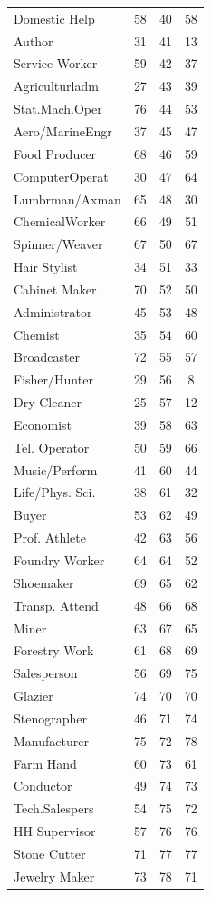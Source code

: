 \begin{tabular}{lccc}
Domestic Help&58&40&58\\
Author&31&41&13\\
Service Worker&59&42&37\\
Agriculturladm&27&43&39\\
Stat.Mach.Oper&76&44&53\\
Aero/MarineEngr&37&45&47\\
Food Producer&68&46&59\\
ComputerOperat&30&47&64\\
Lumbrman/Axman&65&48&30\\
ChemicalWorker&66&49&51\\
Spinner/Weaver&67&50&67\\
Hair Stylist&34&51&33\\
Cabinet Maker&70&52&50\\
Administrator&45&53&48\\
Chemist&35&54&60\\
Broadcaster&72&55&57\\
Fisher/Hunter&29&56&8\\
Dry-Cleaner&25&57&12\\
Economist&39&58&63\\
Tel. Operator&50&59&66\\
Music/Perform&41&60&44\\
Life/Phys. Sci.&38&61&32\\
Buyer&53&62&49\\
Prof. Athlete&42&63&56\\
Foundry Worker&64&64&52\\
Shoemaker&69&65&62\\
Transp. Attend&48&66&68\\
Miner&63&67&65\\
Forestry Work&61&68&69\\
Salesperson&56&69&75\\
Glazier&74&70&70\\
Stenographer&46&71&74\\
Manufacturer&75&72&78\\
Farm Hand&60&73&61\\
Conductor&49&74&73\\
Tech.Salespers&54&75&72\\
HH Supervisor&57&76&76\\
Stone Cutter&71&77&77\\
Jewelry Maker&73&78&71\\
\hline\hline
\end{tabular}
